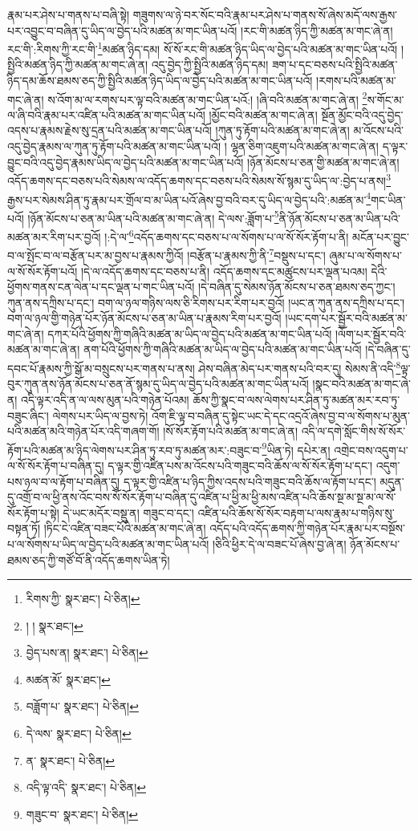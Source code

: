 རྣམ་པར་ཤེས་པ་གནས་པ་བཞི་སྟེ། གཟུགས་ལ་ཉེ་བར་སོང་བའི་རྣམ་པར་ཤེས་པ་གནས་སོ་ཞེས་མདོ་ལས་རྒྱས་པར་འབྱུང་བ་བཞིན་དུ་ཡིད་ལ་བྱེད་པའི་མཚན་མ་གང་ཡིན་པའོ། །རང་གི་མཚན་ཉིད་ཀྱི་མཚན་མ་གང་ཞེ་ན། རང་གི་:རིགས་ཀྱི་རང་གི་\footnote{རིགས་ཀྱི་  སྣར་ཐང་།  པེ་ཅིན། }མཚན་ཉིད་དམ། སོ་སོ་རང་གི་མཚན་ཉིད་ཡིད་ལ་བྱེད་པའི་མཚན་མ་གང་ཡིན་པའོ། །སྤྱིའི་མཚན་ཉིད་ཀྱི་མཚན་མ་གང་ཞེ་ན། འདུ་བྱེད་ཀྱི་སྤྱིའི་མཚན་ཉིད་དམ། ཟག་པ་དང་བཅས་པའི་སྤྱིའི་མཚན་ཉིད་དམ་ཆོས་ཐམས་ཅད་ཀྱི་སྤྱིའི་མཚན་ཉིད་ཡིད་ལ་བྱེད་པའི་མཚན་མ་གང་ཡིན་པའོ། །རགས་པའི་མཚན་མ་གང་ཞེ་ན། ས་འོག་མ་ལ་རགས་པར་ལྟ་བའི་མཚན་མ་གང་ཡིན་པའོ:། །ཞི་བའི་མཚན་མ་གང་ཞེ་ན། \footnote{། །   སྣར་ཐང་། }ས་གོང་མ་ལ་ཞི་བའི་རྣམ་པར་འཛིན་པའི་མཚན་མ་གང་ཡིན་པའོ། །མྱོང་བའི་མཚན་མ་གང་ཞེ་ན། སྔོན་མྱོང་བའི་འདུ་བྱེད་འདས་པ་རྣམས་རྗེས་སུ་དྲན་པའི་མཚན་མ་གང་ཡིན་པའོ། །ཀུན་ཏུ་རྟོག་པའི་མཚན་མ་གང་ཞེ་ན། མ་འོངས་པའི་འདུ་བྱེད་རྣམས་ལ་ཀུན་ཏུ་རྟོག་པའི་མཚན་མ་གང་ཡིན་པའོ། །
ལྷན་ཅིག་འཇུག་པའི་མཚན་མ་གང་ཞེ་ན། ད་ལྟར་བྱུང་བའི་འདུ་བྱེད་རྣམས་ཡིད་ལ་བྱེད་པའི་མཚན་མ་གང་ཡིན་པའོ། །ཉོན་མོངས་པ་ཅན་གྱི་མཚན་མ་གང་ཞེ་ན། འདོད་ཆགས་དང་བཅས་པའི་སེམས་ལ་འདོད་ཆགས་དང་བཅས་པའི་སེམས་སོ་སྙམ་དུ་ཡིད་ལ་:བྱེད་པ་ནས།\footnote{བྱེད་པས་ན།  སྣར་ཐང་།  པེ་ཅིན། } རྒྱས་པར་སེམས་ཤིན་ཏུ་རྣམ་པར་གྲོལ་བ་མ་ཡིན་པའོ་ཞེས་བྱ་བའི་བར་དུ་ཡིད་ལ་བྱེད་པའི་:མཚན་མ་\footnote{མཚན་མོ་  སྣར་ཐང་། }གང་ཡིན་པའོ། །ཉོན་མོངས་པ་ཅན་མ་ཡིན་པའི་མཚན་མ་གང་ཞེ་ན། དེ་ལས་:ཟློག་པ་\footnote{བཟློག་པ་  སྣར་ཐང་།  པེ་ཅིན། }ནི་ཉོན་མོངས་པ་ཅན་མ་ཡིན་པའི་མཚན་མར་རིག་པར་བྱའོ། །:དེ་ལ་\footnote{དེ་ལས་  སྣར་ཐང་།  པེ་ཅིན། }འདོད་ཆགས་དང་བཅས་པ་ལ་སོགས་པ་ལ་སོ་སོར་རྟོག་པ་ནི། མངོན་པར་བྱུང་བ་ལ་སྤོང་བ་ལ་བརྩོན་པར་མ་བྱས་པ་རྣམས་ཀྱིའོ། །བརྩོན་པ་རྣམས་ཀྱི་ནི་\footnote{ན་  སྣར་ཐང་།  པེ་ཅིན། }བསྡུས་པ་དང་། ཞུམ་པ་ལ་སོགས་པ་ལ་སོ་སོར་རྟོག་པའོ། །དེ་ལ་འདོད་ཆགས་དང་བཅས་པ་ནི། འདོད་ཆགས་དང་མཚུངས་པར་ལྡན་པའམ། དེའི་ཕྱོགས་གནས་ངན་ལེན་པ་དང་ལྡན་པ་གང་ཡིན་པའོ། །དེ་བཞིན་དུ་སེམས་ཉོན་མོངས་པ་ཅན་ཐམས་ཅད་ཀྱང་། ཀུན་ནས་དཀྲིས་པ་དང་། བག་ལ་ཉལ་གཉིས་ལས་ཅི་རིགས་པར་རིག་པར་བྱའོ། །ཡང་ན་ཀུན་ནས་དཀྲིས་པ་དང་། བག་ལ་ཉལ་གྱི་གཉེན་པོར་ཉོན་མོངས་པ་ཅན་མ་ཡིན་པ་རྣམས་རིག་པར་བྱའོ། །ཡང་དག་པར་སྦྱོར་བའི་མཚན་མ་གང་ཞེ་ན། དཀར་པོའི་ཕྱོགས་ཀྱི་གཞིའི་མཚན་མ་ཡིད་ལ་བྱེད་པའི་མཚན་མ་གང་ཡིན་པའོ། །ལོག་པར་སྦྱོར་བའི་མཚན་མ་གང་ཞེ་ན། ནག་པོའི་ཕྱོགས་ཀྱི་གཞིའི་མཚན་མ་ཡིད་ལ་བྱེད་པའི་མཚན་མ་གང་ཡིན་པའོ། །དེ་བཞིན་དུ་དབང་པོ་རྣམས་ཀྱི་སྒོ་མ་བསྲུངས་པར་གནས་པ་ནས། ཤེས་བཞིན་མེད་པར་གནས་པའི་བར་དུ། སེམས་ནི་འདི་\footnote{འདི་ལྟ་འདི་  སྣར་ཐང་།  པེ་ཅིན། }ལྟ་བུར་ཀུན་ནས་ཉོན་མོངས་པ་ཅན་ནོ་སྙམ་དུ་ཡིད་ལ་བྱེད་པའི་མཚན་མ་གང་ཡིན་པའོ། །སྣང་བའི་མཚན་མ་གང་ཞེ་ན། འདི་ལྟར་འདི་ན་ལ་ལས་མུན་པའི་གཉེན་པོའམ། ཆོས་ཀྱི་སྣང་བ་ལས་ལེགས་པར་ཤིན་ཏུ་མཚན་མར་རབ་ཏུ་བཟུང་ཞིང་། ལེགས་པར་ཡིད་ལ་བྱས་ཏེ། འོག་ཇི་ལྟ་བ་བཞིན་དུ་སྟེང་ཡང་དེ་དང་འདྲའོ་ཞེས་བྱ་བ་ལ་སོགས་པ་མུན་པའི་མཚན་མའི་གཉེན་པོར་འདི་གཞག་གོ། །སོ་སོར་རྟོག་པའི་མཚན་མ་གང་ཞེ་ན། འདི་ལ་དགེ་སློང་གིས་སོ་སོར་རྟོག་པའི་མཚན་མ་ཉིད་ལེགས་པར་ཤིན་ཏུ་རབ་ཏུ་མཚན་མར་:བཟུང་བ་\footnote{གཟུང་བ་  སྣར་ཐང་།  པེ་ཅིན། }ཡིན་ཏེ། དཔེར་ན། འགྲེང་བས་འདུག་པ་ལ་སོ་སོར་རྟོག་པ་བཞིན་དུ། ད་ལྟར་གྱི་འཛིན་པས་མ་འོངས་པའི་གཟུང་བའི་ཆོས་ལ་སོ་སོར་རྟོག་པ་དང་། འདུག་པས་ཉལ་བ་ལ་རྟོག་པ་བཞིན་དུ། ད་ལྟར་གྱི་འཛིན་པ་ཉིད་ཀྱིས་འདས་པའི་གཟུང་བའི་ཆོས་ལ་རྟོག་པ་དང་། མདུན་དུ་འགྲོ་བ་ལ་ཕྱི་ནས་འོང་བས་སོ་སོར་རྟོག་པ་བཞིན་དུ་འཛིན་པ་ཕྱི་མ་ཕྱི་མས་འཛིན་པའི་ཆོས་སྔ་མ་སྔ་མ་ལ་སོ་སོར་རྟོག་པ་སྟེ། དེ་ཡང་མདོར་བསྡུ་ན། གཟུང་བ་དང་། འཛིན་པའི་ཆོས་སོ་སོར་བརྟག་པ་ལས་རྣམ་པ་གཉིས་སུ་བསྟན་ཏོ། །ཏིང་ངེ་འཛིན་བཟང་པོའི་མཚན་མ་གང་ཞེ་ན། འདོད་པའི་འདོད་ཆགས་ཀྱི་གཉེན་པོར་རྣམ་པར་བསྔོས་པ་ལ་སོགས་པ་ཡིད་ལ་བྱེད་པའི་མཚན་མ་གང་ཡིན་པའོ། །ཅིའི་ཕྱིར་དེ་ལ་བཟང་པོ་ཞེས་བྱ་ཞེ་ན། ཉོན་མོངས་པ་ཐམས་ཅད་ཀྱི་གཙོ་བོ་ནི་འདོད་ཆགས་ཡིན་ཏེ། 